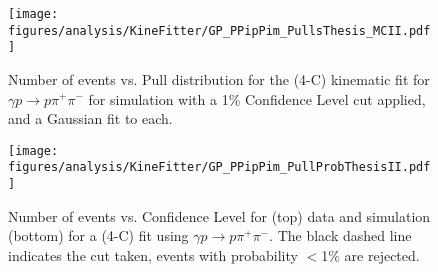 %
%
\begin{figure}[h!]\begin{center}
\texttt{[image: \\figures/analysis/KineFitter/GP\_PPipPim\_PullsThesis\_MCII.pdf]}
\caption[Number of events vs. Pull distribution for the (4-C) kinematic fit for $\gamma p \rightarrow p \pi^+ \pi^-$ for  simulation with a 1\% Confidence Level cut applied, and a Gaussian fit to each]{\label{fig:kinfit.PiPullMC}Number of events vs. Pull distribution for the (4-C) kinematic fit for $\gamma p \rightarrow p \pi^+ \pi^-$ for  simulation with a 1\% Confidence Level cut applied, and a Gaussian fit to each.}
\end{center}\end{figure}
%
%
\begin{figure}[h!]\begin{center}
\texttt{[image: \\figures/analysis/KineFitter/GP\_PPipPim\_PullProbThesisII.pdf]}
\caption[Number of events vs. Confidence Level for  (top) data and  simulation (bottom) for a (4-C) fit using $\gamma p \rightarrow p \pi^+ \pi^-$]{\label{fig:kinfit.PiPullProb}Number of events vs. Confidence Level for  (top) data and  simulation (bottom) for a (4-C) fit using $\gamma p \rightarrow p \pi^+ \pi^-$. The black dashed line indicates the cut taken, events with probability $<$1\% are rejected.}
\end{center}\end{figure}
%
%
\FloatBarrier

